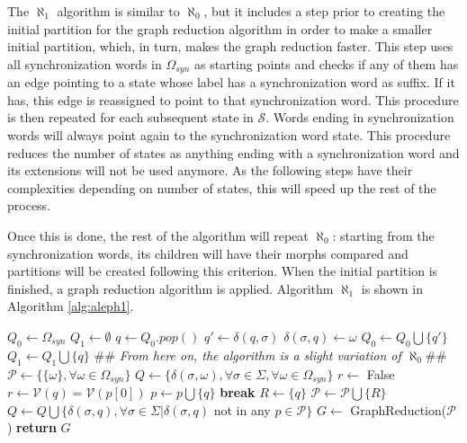 {The $\aleph_1$ algorithm is similar to $\aleph_0$, but it includes a step prior to creating the initial partition for the graph reduction algorithm in order to make a smaller initial partition, which, in turn, makes the graph reduction faster. This step uses all synchronization words in $\Omega_{syn}$ as starting points and checks if any of them has an edge pointing to a state whose label has a synchronization word as suffix. If it has, this edge is reassigned to point to that synchronization word. This procedure is then repeated for each subsequent state in $\mathcal{S}$. Words ending in synchronization words will always point again to the synchronization word state. This procedure reduces the number of states as anything ending with a synchronization word and its extensions will not be used anymore. As the following steps have their complexities depending on number of states, this will speed up the rest of the process.

Once this is done, the rest of the algorithm will repeat $\aleph_0$: starting from the synchronization words, its children will have their morphs compared and partitions will be created following this criterion. When the initial partition is finished, a graph reduction algorithm is applied. Algorithm $\aleph_1$ is shown in Algorithm \ref{alg:aleph1}.

\begin{algorithm}
  \caption{$\aleph_1$($\mathcal{S}, \Omega_{syn}$)\label{alg:aleph1}}
    \begin{algorithmic}[1]
      \Procedure{}{}
      	\State $Q_0 \gets \Omega_{syn}$
      	\State $Q_1 \gets \emptyset$
      		\State $q \gets Q_0.pop()$
      		\For{$\sigma \in \Sigma$}
      			\State $q' \gets \delta(q,\sigma)$
      				\State $\delta(\sigma,q) \gets \omega$
      			\Else
      					\State $Q_0 \gets Q_0\bigcup\{q'\}$
      				\EndIf 
      			\EndIf
      			\State $Q_1 \gets Q_1\bigcup\{q\}$
      		\EndFor
      	\EndWhile
      	\State \textit{$\#\#$ From here on, the algorithm is a slight variation of $\aleph_0\#\#$}
      	\State $\mathcal{P} \gets \{\{\omega\}, \forall \omega \in \Omega_{syn}\}$
      	\State $Q \gets \{\delta(\sigma,\omega), \forall \sigma \in \Sigma, \forall \omega \in \Omega_{syn}\}$
      		\State $r \gets$ False
      			\State $r \gets \mathcal{V}(q) = \mathcal{V}(p[0])$
      				\State $p \gets p\bigcup\{q\}$
      				\State \textbf{break}
      			\EndIf
      		\EndFor
      			\State $R \gets \{q\}$
      			\State $\mathcal{P} \gets \mathcal{P}\bigcup\{R\}$
      		\EndIf 
      		\State $Q \gets Q\bigcup\{\delta(\sigma,q),\forall \sigma\in\Sigma|\delta(\sigma,q)$ not in any $p\in\mathcal{P}\}$
      	\EndFor
      	\State $G \gets$ GraphReduction($\mathcal{P}$)
      	\State \textbf{return} $G$
      \EndProcedure
    \end{algorithmic}
  \end{algorithm}


}
